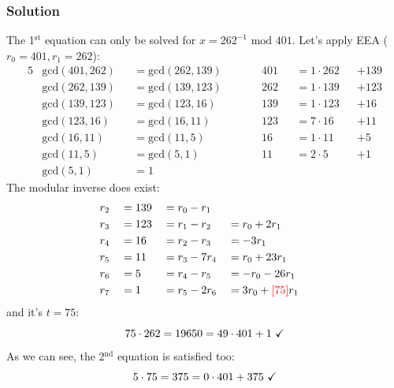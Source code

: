 \documentclass[11pt, a4paper]{article}
\newcommand{\mymod}{
    \text{ mod }
}
\begin{document}
\subsubsection*{Solution}
The 1$^\text{st}$ equation can only be solved for $x=262^{-1}\mymod401$. Let's apply EEA ($r_0=401, r_1=262$):
\begin{alignat*}{5}
    &\text{gcd}(401,262)&&=\text{gcd}(262,139)\qquad&&401&&=1\cdot262&&+139\\
    &\text{gcd}(262,139)&&=\text{gcd}(139,123)\qquad&&262&&=1\cdot139&&+123\\
    &\text{gcd}(139,123)&&=\text{gcd}(123,16)\qquad&&139&&=1\cdot123&&+16\\
    &\text{gcd}(123,16)&&=\text{gcd}(16,11)\qquad&&123&&=7\cdot16&&+11\\
    &\text{gcd}(16,11)&&=\text{gcd}(11,5)\qquad&&16&&=1\cdot11&&+5\\
    &\text{gcd}(11,5)&&=\text{gcd}(5,1)\qquad&&11&&=2\cdot5&&+1\\
    &\text{gcd}(5,1)&&=1
\end{alignat*}
The modular inverse does exist:
\begin{alignat*}{4}
    &r_2&&=139&&=r_0-r_1\\
    &r_3&&=123&&=r_1-r_2&&=r_0+2r_1\\
    &r_4&&=16&&=r_2-r_3&&=-3r_1\\
    &r_5&&=11&&=r_3-7r_4&&=r_0+23r_1\\
    &r_6&&=5&&=r_4-r_5&&=-r_0-26r_1\\
    &r_7&&=1&&=r_5-2r_6&&=3r_0+\textcolor{red}{[75]}r_1
\end{alignat*}
and it's $t=75$:
$$75\cdot262=19650=49\cdot401+1\text{ \checkmark}$$
As we can see, the 2$^\text{nd}$ equation is satisfied too:
$$5\cdot75=375=0\cdot401+375\text{ \checkmark}$$
\end{document}
